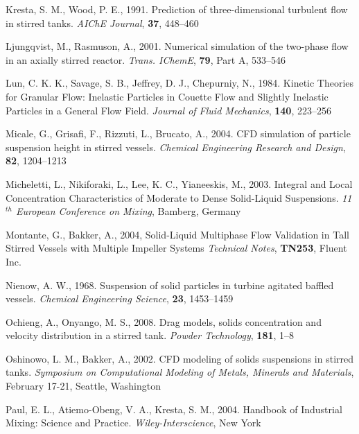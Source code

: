 \begin{thebibliography}{99}
 Kresta, S. M., Wood, P. E., 1991. Prediction of three-dimensional turbulent flow in stirred tanks. \textit{AIChE Journal}, \textbf{37}, 448--460 

 Ljungqvist, M., Rasmuson, A., 2001. Numerical simulation of the two-phase flow in an axially stirred reactor. \textit{Trans. IChemE}, \textbf{79}, Part A, 533--546

 Lun, C. K. K., Savage, S. B., Jeffrey, D. J., Chepurniy, N., 1984. Kinetic Theories for Granular Flow: Inelastic Particles in Couette Flow and Slightly Inelastic Particles in a General Flow Field. \textit{Journal of Fluid Mechanics}, \textbf{140}, 223--256 

 Micale, G., Grisafi, F., Rizzuti, L., Brucato, A., 2004. CFD simulation of particle suspension height in stirred vessels. \textit{Chemical Engineering Research and Design}, \textbf{82}, 1204--1213

 Micheletti, L., Nikiforaki, L., Lee, K. C., Yianeeskis, M., 2003. Integral and Local Concentration Characteristics of Moderate to Dense Solid-Liquid Suspensions. \textit{11$^{th}$ European Conference on Mixing}, Bamberg, Germany

 Montante, G., Bakker, A., 2004, Solid-Liquid Multiphase Flow Validation in Tall Stirred Vessels with Multiple Impeller Systems \textit{Technical Notes}, \textbf{TN253}, Fluent Inc.

 Nienow, A. W., 1968. Suspension of solid particles in turbine agitated baffled vessels. \textit{Chemical Engineering Science}, \textbf{23}, 1453--1459 

 Ochieng, A., Onyango, M. S., 2008. Drag models, solids concentration and velocity distribution in a stirred tank. \textit{Powder Technology}, \textbf{181}, 1--8

 Oshinowo, L. M., Bakker, A., 2002. CFD modeling of solids suspensions in stirred tanks. \textit{Symposium on Computational Modeling of Metals, Minerals and Materials}, February 17-21, Seattle, Washington 

 Paul, E. L., Atiemo-Obeng, V. A., Kresta, S. M., 2004. Handbook of Industrial Mixing: Science and Practice. \textit{Wiley-Interscience}, New York


\end{thebibliography}
